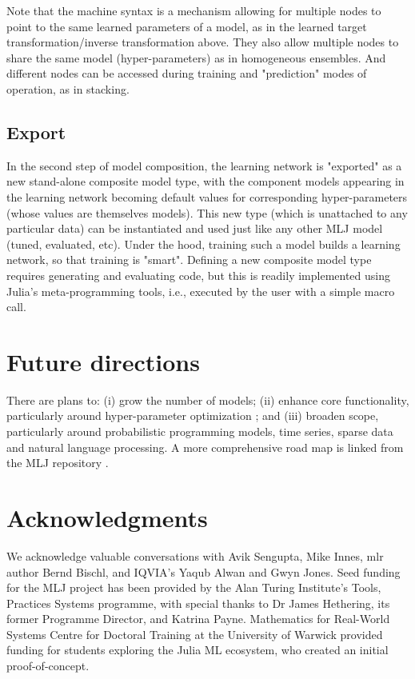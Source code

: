 \documentclass{article}
\begin{document}

Note that the machine syntax is a mechanism allowing for multiple
nodes to point to the same learned parameters of a model, as in the
learned target transformation/inverse transformation above. They also
allow multiple nodes to share the same model (hyper-parameters) as in
homogeneous ensembles. And different nodes can be accessed during
training and "prediction" modes of operation, as in stacking.

\subsection{Export}

In the second step of model composition, the learning network is
"exported" as a new stand-alone composite model type, with the
component models appearing in the learning network becoming default
values for corresponding hyper-parameters (whose values are themselves
models). This new type (which is unattached to any particular data)
can be instantiated and used just like any other MLJ model (tuned,
evaluated, etc). Under the hood, training such a model builds a
learning network, so that training is "smart". Defining a new
composite model type requires generating and evaluating code, but this
is readily implemented using Julia's meta-programming tools, i.e.,
executed by the user with a simple macro call.

\section{Future directions}

There are plans to: (i) grow the number of models; (ii) enhance core
functionality, particularly around hyper-parameter optimization
\cite{MLJTuning}; and (iii) broaden scope, particularly around
probabilistic programming models, time series, sparse data and natural
language processing. A more comprehensive road map is linked from the
MLJ repository \cite{MLJ}.

\section*{Acknowledgments}

We acknowledge valuable conversations with Avik Sengupta, Mike Innes,
mlr author Bernd Bischl, and IQVIA's Yaqub Alwan and Gwyn Jones. Seed
funding for the MLJ project has been provided by the Alan Turing
Institute's Tools, Practices Systems programme, with special thanks
to Dr James Hethering, its former Programme Director, and Katrina
Payne. Mathematics for Real-World Systems Centre for Doctoral Training
at the University of Warwick provided funding for students exploring
the Julia ML ecosystem, who created an initial proof-of-concept.
\end{document}
